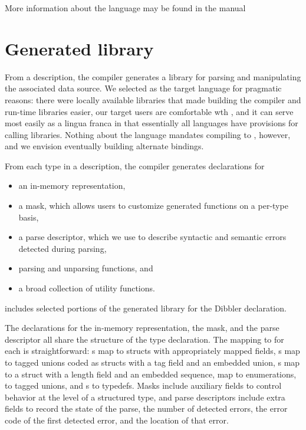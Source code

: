 \documentclass{sig-alternate}
\begin{document}
More information about the \pads{} language may be found in the
\pads{} manual~\cite{padsmanual}

\section{Generated library}
From a \pads{} description, the \pads{} compiler generates a \C{} library
for parsing and manipulating the associated data source.  We selected \C{}
as the target language for pragmatic reasons: there were locally available
libraries that made building the compiler and run-time libraries easier,
our target users are comfortable wth \C{}, and it can serve most easily
as a lingua franca in that essentially all languages have provisions for 
calling \C{} libraries.  Nothing about the \pads{} language mandates compiling
to \C{}, however, and we envision eventually building alternate bindings.

From each type in a \pads{} description, the compiler generates 
\C{} declarations for
\begin{itemize}
\item an in-memory representation, 
\item a mask, which allows users to customize generated functions
on a per-type basis,
\item a parse descriptor, which we use to describe syntactic and
semantic errors detected during parsing, 
\item parsing and unparsing functions, and 
\item a broad collection of utility functions.
\end{itemize}

 includes selected portions of the generated 
library for the Dibbler  declaration.

The \C{} declarations for the in-memory representation, the mask, 
and the parse descriptor all share the structure of the \pads{}
type declaration.  The mapping to \C{} for each is straightforward: 
s map to \C{} structs with appropriately mapped fields, 
s map to tagged unions coded as \C{} structs with a tag field 
and an embedded 
union, s map to a \C{} struct with a length field and an 
embedded sequence,  map to \C{} enumerations,  
to tagged unions, and s to \C{} typedefs.  Masks include
auxiliary fields to control behavior at the level of a structured
type, and parse descriptors include extra fields to record the 
state of the parse, the number of detected errors, 
the error code of the first detected error, and the location of that error.
\end{document}
